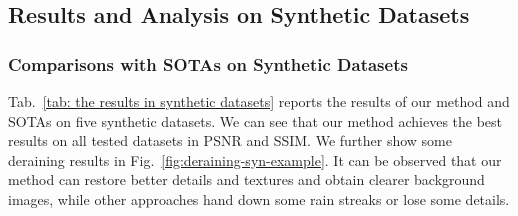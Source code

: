 \documentclass[letterpaper]{article} %
\begin{document}
\subsection{Results and Analysis on Synthetic Datasets}
%
%
\subsubsection{Comparisons with SOTAs on Synthetic Datasets}
%
Tab.~\ref{tab: the results in synthetic datasets} reports the results of our method and SOTAs on five synthetic datasets.
We can see that our method achieves the best results on all tested datasets in PSNR and SSIM.
We further show some deraining results in Fig.~\ref{fig:deraining-syn-example}.
It can be observed that our method can restore better details and textures and obtain clearer background images, while other approaches hand down some rain streaks or lose some details.


%
\end{document}
